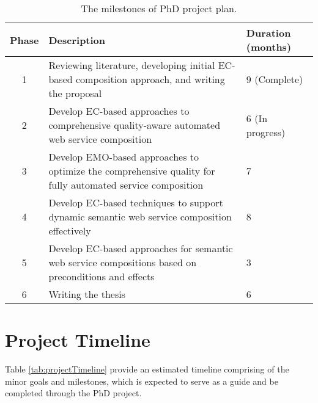 \begin{table}
\small
\centering
\caption{The milestones of PhD project plan.}
\vspace{0.2cm}
\begin{tabular}{|c|p{100mm}|l|}
\hline
Phase & Description & Duration (months) \\ \hline
1 & Reviewing literature, developing initial EC-based composition approach, and writing the proposal & 9 (Complete)  \\
2 & Develop EC-based approaches to comprehensive quality-aware automated web service composition & 6 (In progress) \\
3 & Develop EMO-based approaches to optimize the comprehensive quality for fully automated service composition & 7 \\
4 & Develop EC-based techniques to support dynamic semantic web service composition effectively & 8 \\
5 & Develop EC-based approaches for semantic web service compositions based on preconditions and effects & 3 \\
6 & Writing the thesis & 6 \\ \hline
\end{tabular}
\label{tab:projectOverview}
\end{table}

\section{Project Timeline}

Table \ref{tab:projectTimeline} provide an estimated timeline comprising of the minor goals and milestones, which is expected to serve as a guide and be completed through the PhD project.

